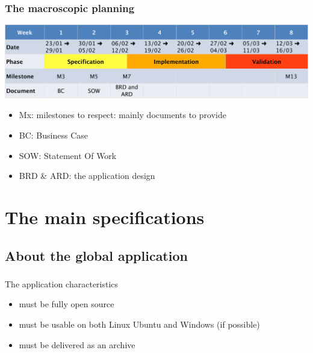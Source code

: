 \documentclass{beamer}
\begin{document}
\begin{frame}
	\frametitle{The macroscopic planning}

    \begin{center}
		\includegraphics[width=\textwidth]{planning}	
	\end{center}
	
	\begin{block}{}
    \begin{itemize}
		\item Mx: milestones to respect: mainly documents to provide
		\item BC: Business Case
		\item SOW: Statement Of Work
		\item BRD \& ARD: the application design 
	\end{itemize}
	\end{block}
	
\end{frame}



\section{The main specifications}

\subsection{About the global application}
\begin{frame}
	\frametitle{}
	 \begin{block}{The application characteristics}
		\begin{itemize}
			\item must be fully open source
			\item must be usable on both Linux Ubuntu and Windows (if possible)
			\item must be delivered as an archive
		\end{itemize}
    \end{block}
\end{frame}
    
\end{document}
